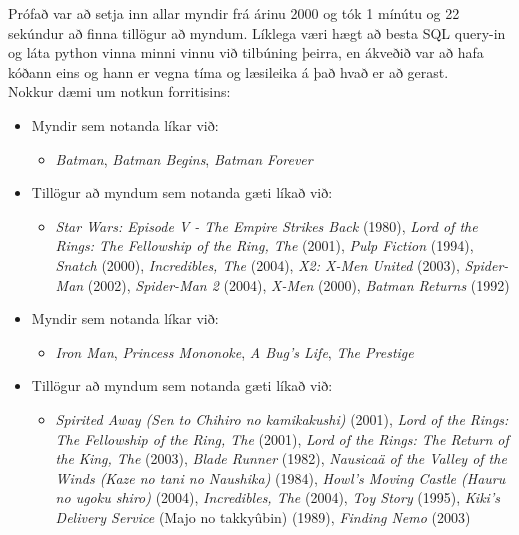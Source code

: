 \documentclass[12pt, git, final]{rureport}
\begin{document}
Prófað var að setja inn allar myndir frá árinu 2000 og tók 1 mínútu og 22 sekúndur að finna tillögur að myndum. Líklega væri hægt að besta SQL query-in og láta python vinna minni vinnu við tilbúning þeirra, en ákveðið var að hafa kóðann eins og hann er vegna tíma og læsileika á það hvað er að gerast.
\\
Nokkur dæmi um notkun forritisins:
\begin{itemize}
	\item Myndir sem notanda líkar við:
	\begin{itemize}
		\item \textit{Batman}, \textit{Batman Begins}, \textit{Batman Forever}
	\end{itemize}
	\item Tillögur að myndum sem notanda gæti líkað við:
	\begin{itemize}
		\item \textit{Star Wars: Episode V - The Empire Strikes Back}  (1980), \textit{Lord of the Rings: The Fellowship of the Ring, The}  (2001), \textit{Pulp Fiction}  (1994), \textit{Snatch}  (2000), \textit{Incredibles, The}  (2004), \textit{X2: X-Men United}  (2003), \textit{Spider-Man}  (2002), \textit{Spider-Man 2}  (2004), \textit{X-Men}  (2000), \textit{Batman Returns}  (1992)
	\end{itemize}
	
	\item Myndir sem notanda líkar við:
	\begin{itemize}
		\item \textit{Iron Man}, \textit{Princess Mononoke}, \textit{A Bug's Life}, \textit{The Prestige}
	\end{itemize}
	\item Tillögur að myndum sem notanda gæti líkað við:
	\begin{itemize}
		\item \textit{Spirited Away (Sen to Chihiro no kamikakushi)}  (2001), \textit{Lord of the Rings: The Fellowship of the Ring, The}  (2001), \textit{Lord of the Rings: The Return of the King, The}  (2003), \textit{Blade Runner}  (1982), \textit{Nausicaä of the Valley of the Winds (Kaze no tani no Naushika)}  (1984), \textit{Howl's Moving Castle (Hauru no ugoku shiro)}  (2004), \textit{Incredibles, The}  (2004), \textit{Toy Story}  (1995), \textit{Kiki's Delivery Service} (Majo no takkyûbin)  (1989), \textit{Finding Nemo}  (2003)
	\end{itemize}
	

\end{itemize}
\end{document}
